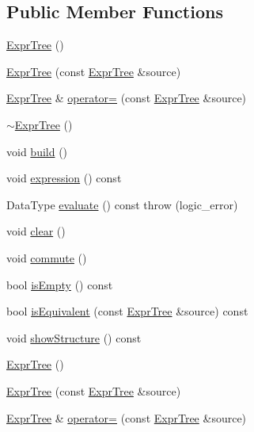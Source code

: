 \subsection*{Public Member Functions}
\begin{DoxyCompactItemize}
\item 
\hyperlink{class_expr_tree_a1d5004443b461637bcb0fe0a86759d50}{Expr\+Tree} ()
\item 
\hyperlink{class_expr_tree_aeec9dc6139cf32fcc911840bab438239}{Expr\+Tree} (const \hyperlink{class_expr_tree}{Expr\+Tree} \&source)
\item 
\hyperlink{class_expr_tree}{Expr\+Tree} \& \hyperlink{class_expr_tree_a9a7b2120af2c2df666b1154eec20008a}{operator=} (const \hyperlink{class_expr_tree}{Expr\+Tree} \&source)
\item 
\hyperlink{class_expr_tree_a8976e9af7e1209b9db475b863ab9f31d}{$\sim$\+Expr\+Tree} ()
\item 
void \hyperlink{class_expr_tree_a283a61049eb163f6f370d562cc92c824}{build} ()
\item 
void \hyperlink{class_expr_tree_ac367645dc4ccaf488e121cd5a0a8c07d}{expression} () const 
\item 
Data\+Type \hyperlink{class_expr_tree_ad1579e64d55cdfcd500a634ef69ed792}{evaluate} () const   throw (logic\+\_\+error)
\item 
void \hyperlink{class_expr_tree_a87d6593a3ad6199b5521f6d1e3ba851f}{clear} ()
\item 
void \hyperlink{class_expr_tree_a8bfcf0da6dfd93f4228a35cded704fb4}{commute} ()
\item 
bool \hyperlink{class_expr_tree_adfa8f6dd2a984f83b2eb50958a0bb585}{is\+Empty} () const 
\item 
bool \hyperlink{class_expr_tree_ae64a4e3b5008fa2f533fd7461ead2485}{is\+Equivalent} (const \hyperlink{class_expr_tree}{Expr\+Tree} \&source) const 
\item 
void \hyperlink{class_expr_tree_a6f4c5e2ae8224fb53fb893231814e6d9}{show\+Structure} () const 
\item 
\hyperlink{class_expr_tree_a1d5004443b461637bcb0fe0a86759d50}{Expr\+Tree} ()
\item 
\hyperlink{class_expr_tree_aeec9dc6139cf32fcc911840bab438239}{Expr\+Tree} (const \hyperlink{class_expr_tree}{Expr\+Tree} \&source)
\item 
\hyperlink{class_expr_tree}{Expr\+Tree} \& \hyperlink{class_expr_tree_a4595df38a3ddeb54994af6fced99ae03}{operator=} (const \hyperlink{class_expr_tree}{Expr\+Tree} \&source)
\item 

\end{DoxyCompactItemize}
